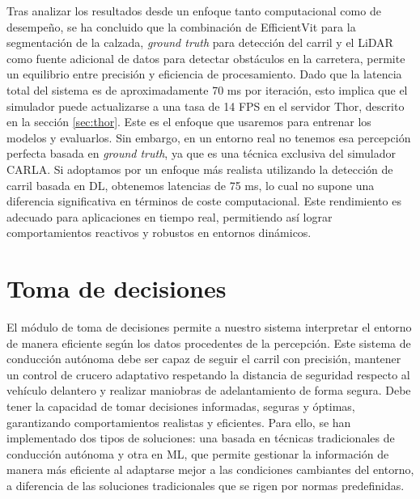 Tras analizar los resultados desde un enfoque tanto computacional como de desempeño, se ha concluido que la combinación de EfficientVit para la segmentación de la calzada, \textit{ground truth} para detección del carril y el \ac{LiDAR} como fuente adicional de datos para detectar obstáculos en la carretera, permite un equilibrio entre precisión y eficiencia de procesamiento. Dado que la latencia total del sistema es de aproximadamente 70 ms por iteración, esto implica que el simulador puede actualizarse a una tasa de 14 \ac{FPS} en el servidor Thor, descrito en la sección \ref{sec:thor}. Este es el enfoque que usaremos para entrenar los modelos y evaluarlos. Sin embargo, en un entorno real no tenemos esa percepción perfecta basada en \textit{ground truth}, ya que es una técnica exclusiva del simulador CARLA. Si adoptamos por un enfoque más realista utilizando la detección de carril basada en \ac{DL}, obtenemos latencias de 75 ms, lo cual no supone una diferencia significativa en términos de coste computacional. Este rendimiento es adecuado para aplicaciones en tiempo real, permitiendo así lograr comportamientos reactivos y robustos en entornos dinámicos.

\section{Toma de decisiones}

El módulo de toma de decisiones permite a nuestro sistema interpretar el entorno de manera eficiente según los datos procedentes de la percepción. Este sistema de conducción autónoma debe ser capaz de seguir el carril con precisión, mantener un control de crucero adaptativo respetando la distancia de seguridad respecto al vehículo delantero y realizar maniobras de adelantamiento de forma segura. Debe tener la capacidad de tomar decisiones informadas, seguras y óptimas, garantizando comportamientos realistas y eficientes. Para ello, se han implementado dos tipos de soluciones: una basada en técnicas tradicionales de conducción autónoma y otra en \ac{ML}, que permite gestionar la información de manera más eficiente al adaptarse mejor a las condiciones cambiantes del entorno, a diferencia de las soluciones tradicionales que se rigen por normas predefinidas.

